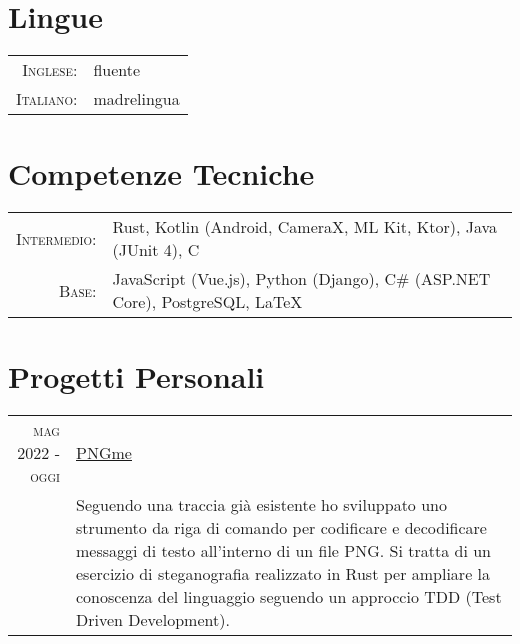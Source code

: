\documentclass[a4paper,10pt]{article} %
\begin{document}

\section{Lingue}

\begin{tabular}{rl}
\textsc{Inglese:} & fluente\\
\textsc{Italiano:} & madrelingua\\
\end{tabular}


\section{Competenze Tecniche}

\begin{tabular}{rl}
\textsc{Intermedio:} & Rust, Kotlin \footnotesize(Android, CameraX, ML Kit, Ktor)\normalsize, Java \footnotesize(JUnit 4)\normalsize, C\\
\textsc{Base:} & JavaScript \footnotesize(Vue.js)\normalsize, Python \footnotesize(Django)\normalsize, C\# \footnotesize(ASP.NET Core)\normalsize, PostgreSQL, {\sffamily\LaTeX}\setmainfont[SmallCapsFont=Fontin SmallCaps]{Fontin-Regular}\\
\end{tabular}


\section{Progetti Personali}

\begin{tabular}{r|p{10.5cm}}
\textsc{mag 2022 - oggi} & \href{https://github.com/rdxdkr/my-PNGme}{\underline{PNGme}} \emph{}\\ & \footnotesize{Seguendo una traccia già esistente ho sviluppato uno strumento da riga di comando per codificare e decodificare messaggi di testo all'interno di un file PNG. Si tratta di un esercizio di steganografia realizzato in Rust per ampliare la conoscenza del linguaggio seguendo un approccio TDD (Test Driven Development).}
\end{tabular}
\end{document}
